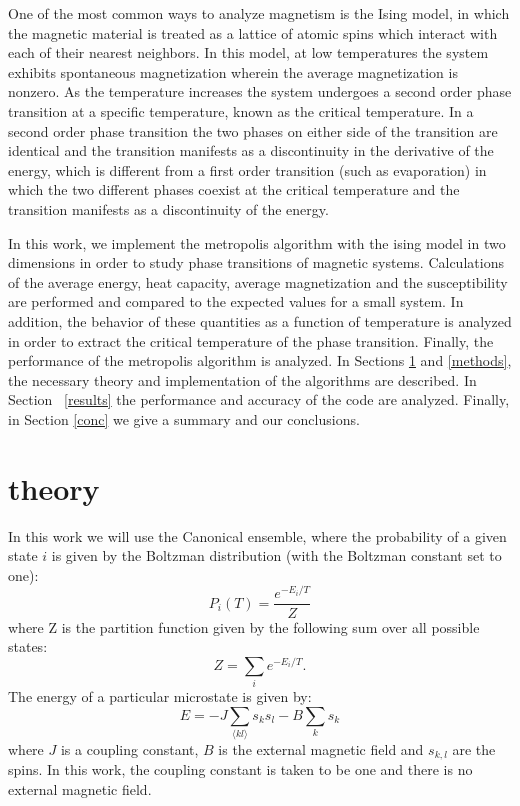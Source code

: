 \documentclass[prc,amsmath,twocolumn,superscriptaddress]{revtex4}
\begin{document}
One of the most common ways to analyze magnetism is the Ising model, in which the magnetic material is treated as a lattice of atomic spins which interact with each of their nearest neighbors. In this model, at low temperatures the system exhibits spontaneous magnetization wherein the average magnetization is nonzero. As the temperature increases the system undergoes a second order phase transition at a specific temperature, known as the critical temperature. In a second order phase transition the two phases on either side of the transition are identical and the transition manifests as a discontinuity in the derivative of the energy, which is different from a first order transition (such as evaporation) in which the two different phases coexist at the critical temperature and the transition manifests as a discontinuity of the energy.

In this work, we implement the metropolis algorithm with the ising model in two dimensions in order to study phase transitions of magnetic systems. Calculations of the average energy, heat capacity, average magnetization and the susceptibility are performed and compared to the expected values for a small system. In addition, the behavior of these quantities as a function of temperature is analyzed in order to extract the critical temperature of the phase transition. Finally, the performance of the metropolis algorithm is analyzed. In Sections \ref{theory} and \ref{methods}, the necessary theory and implementation of the algorithms are described. In Section ~\ref{results} the performance and accuracy of the code are analyzed. Finally, in Section \ref{conc} we give a summary and our conclusions.

\section{theory}
\label{theory}
In this work we will use the Canonical ensemble, where the probability of a given state $i$ is given by the Boltzman distribution (with the Boltzman constant set to one):
\begin{equation}
P_i(T) = \frac{e^{-E_i/T}}{Z}
\end{equation}
where Z is the partition function given by the following sum over all possible states:
\begin{equation}
Z=\sum_i e^{-E_i/T}.
\end{equation}
The energy of a particular microstate is given by:
\begin{equation}
E= -J\sum_{\langle kl \rangle} s_ks_l-B\sum_k s_k
\end{equation}
where $J$ is a coupling constant, $B$ is the external magnetic field and $s_{k,l}$ are the spins. In this work, the coupling constant is taken to be one and there is no external magnetic field.
\end{document}
